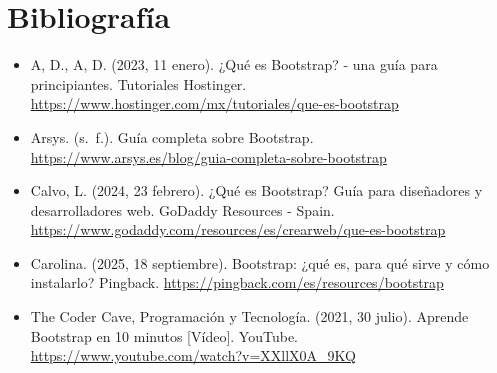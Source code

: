 \documentclass[11pt]{scrartcl}
\begin{document}
    \section{Bibliografía}

\begin{itemize}
    \item  A, D.,  A, D. (2023, 11 enero). ¿Qué es Bootstrap? - una guía para principiantes. Tutoriales Hostinger. \url{https://www.hostinger.com/mx/tutoriales/que-es-bootstrap} 
    \item Arsys. (s. f.). Guía completa sobre Bootstrap. \url{https://www.arsys.es/blog/guia-completa-sobre-bootstrap}
    \item Calvo, L. (2024, 23 febrero). ¿Qué es Bootstrap? Guía para diseñadores y desarrolladores web. GoDaddy Resources - Spain. \url{https://www.godaddy.com/resources/es/crearweb/que-es-bootstrap}
    \item Carolina. (2025, 18 septiembre). Bootstrap: ¿qué es, para qué sirve y cómo instalarlo? Pingback. \url{https://pingback.com/es/resources/bootstrap} 
    \item The Coder Cave, Programación y Tecnología. (2021, 30 julio). Aprende Bootstrap en 10 minutos [Vídeo]. YouTube. \url{https://www.youtube.com/watch?v=XXllX0A_9KQ}
\end{itemize}
    
\end{document}
